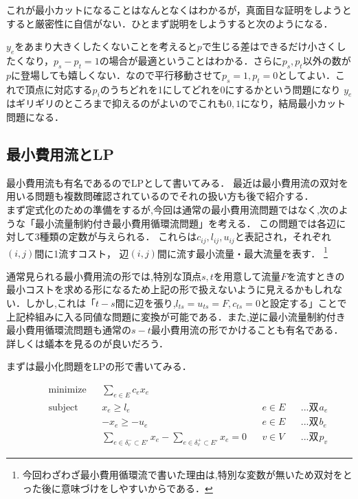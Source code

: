 \documentclass[13pt]{jarticle}
\theoremstyle{nonitalic} %
\begin{document}
これが最小カットになることはなんとなくはわかるが，真面目な証明をしようとすると厳密性に自信がない．ひとまず説明をしようすると次のようになる．

$y_e$をあまり大きくしたくないことを考えると$p$で生じる差はできるだけ小さくしたくなり，$p_s-p_t=1$の場合が最適ということはわかる．さらに$p_s, p_t$以外の数が$p$に登場しても嬉しくない．なので平行移動させて$p_s=1, p_t=0$としてよい．これで頂点に対応する$p_i$のうちどれを1にしてどれを$0$にするかという問題になり $y_e$ はギリギリのところまで抑えるのがよいのでこれも$0,1$になり，結局最小カット問題になる．


\subsection{最小費用流とLP}
\label{mcf}
最小費用流も有名であるのでLPとして書いてみる． 
最近は最小費用流の双対を用いる問題も複数問確認されているのでそれの扱い方も後で紹介する．\\

まず定式化のための準備をするが,今回は通常の最小費用流問題ではなく,次のような「最小流量制約付き最小費用循環流問題」を考える．
この問題では各辺に対して3種類の定数が与えられる． これらは$c_{ij}, l_{ij}, u_{ij}$と表記され，それぞれ $(i,j)$間に1流すコスト， 辺$(i,j)$間に流す最小流量・最大流量を表す． \footnote{今回わざわざ最小費用循環流で書いた理由は,特別な変数が無いため双対をとった後に意味づけをしやすいからである．}

通常見られる最小費用流の形では,特別な頂点$s,t$を用意して流量$F$を流すときの最小コストを求める形になるため上記の形で扱えないように見えるかもしれない．しかし,これは「$t-s$間に辺を張り,$l_{ts}=u_{ts} = F, c_{ts}=0$と設定する」ことで上記枠組みに入る同値な問題に変換が可能である．また,逆に最小流量制約付き最小費用循環流問題も通常の$s-t$最小費用流の形でかけることも有名である．詳しくは蟻本を見るのが良いだろう．

まずは最小化問題をLPの形で書いてみる．

\begin{align}
 &&&&&\textrm{minimize}   && \sum_{e\in E} c_e x_e  \\
 &&&&&\textrm{subject to} && x_{e} \geq l_e & &e  \in E && \textrm{...双対変数$a_e$} \\
 &&&&& && -x_{e} \geq -u_e && e \in E && \textrm{...双対変数$b_e$}\\
 &&&&&                    && \sum_{e \in \delta_v^-  \subset E'} x_e - \sum_{e \in \delta_v^+  \subset E'} x_e= 0 && v \in V && \textrm{...双対変数$p_v$} &&&&& 
\end{align}
\end{document}
